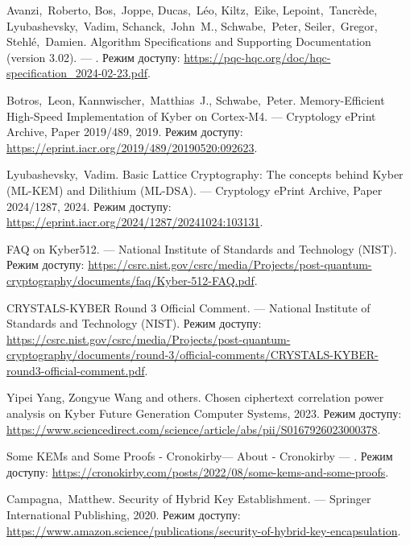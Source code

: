 \begin{thebibliography}
        Avanzi,~Roberto, Bos,~Joppe, Ducas,~Léo, Kiltz,~Eike, Lepoint,~Tancrède, Lyubashevsky,~Vadim, Schanck,~John~M., Schwabe,~Peter, Seiler,~Gregor, Stehlé,~Damien. Algorithm Specifications and Supporting Documentation (version 3.02). ---  
        .  
        \newblock Режим доступу: \url{https://pqc-hqc.org/doc/hqc-specification_2024-02-23.pdf}.
    
        Botros,~Leon, Kannwischer,~Matthias~J., Schwabe,~Peter. Memory-Efficient High-Speed Implementation of Kyber on Cortex-M4. ---  
        \newblock Cryptology ePrint Archive, Paper 2019/489, 2019.  
        \newblock Режим доступу: \url{https://eprint.iacr.org/2019/489/20190520:092623}.

        Lyubashevsky,~Vadim. Basic Lattice Cryptography: The concepts behind Kyber (ML-KEM) and Dilithium (ML-DSA). ---  
        \newblock Cryptology ePrint Archive, Paper 2024/1287, 2024.  
        \newblock Режим доступу: \url{https://eprint.iacr.org/2024/1287/20241024:103131}.

        FAQ on Kyber512. ---  
        \newblock National Institute of Standards and Technology (NIST).  
        \newblock Режим доступу: \url{https://csrc.nist.gov/csrc/media/Projects/post-quantum-cryptography/documents/faq/Kyber-512-FAQ.pdf}.

        CRYSTALS-KYBER Round 3 Official Comment. ---  
        \newblock National Institute of Standards and Technology (NIST).  
        \newblock Режим доступу: \url{https://csrc.nist.gov/csrc/media/Projects/post-quantum-cryptography/documents/round-3/official-comments/CRYSTALS-KYBER-round3-official-comment.pdf}.

        Yipei Yang, Zongyue Wang and others. Chosen ciphertext correlation power analysis on Kyber
        \newblock Future Generation Computer Systems, 2023.  
        \newblock Режим доступу: \url{https://www.sciencedirect.com/science/article/abs/pii/S0167926023000378}.

      Some KEMs and Some Proofs - Cronokirby---
        \newblock About - Cronokirby ---
        . Режим доступу: \url{
          https://cronokirby.com/posts/2022/08/some-kems-and-some-proofs}.

        Campagna,~Matthew. Security of Hybrid Key Establishment. ---
        \newblock Springer International Publishing, 2020.  
        \newblock Режим доступу: \url{
            https://www.amazon.science/publications/security-of-hybrid-key-encapsulation}.
    
 
\end{thebibliography}

